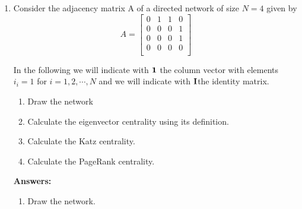 \documentclass{amsart}
\theoremstyle{definition}
\theoremstyle{remark}
\numberwithin{equation}{section}
\begin{document}
\clearpage
\begin{enumerate}

\item Consider the adjacency matrix A of a directed network of size $N = 4$ given by \vspace{0.2cm}
\begin{equation*}
{A}  = \left\lbrack\begin{array}{cccc}
0 & 1 & 1 & 0 \\
0 & 0 & 0 & 1 \\
0 & 0 & 0 & 1 \\
0 & 0 & 0 & 0 \\
\end{array}\right\rbrack
\end{equation*}

\vspace{0.2cm}
In the following we will indicate with ${\bf 1}$ the column vector with elements $i_i = 1$ for $i = 1, 2, \cdots, N$ and we will indicate with ${\bf I}$the identity matrix. \vspace{0.2cm}
\begin{enumerate}
\item Draw the network
\item Calculate the eigenvector centrality using its definition.
\item Calculate the Katz centrality.
\item Calculate the PageRank centrality. 
\end{enumerate}
\vspace{1cm}

\textbf{Answers:}

\begin{enumerate}
\item Draw the network. \vspace{0.2cm}



\end{enumerate}
\end{enumerate}
\end{document}
